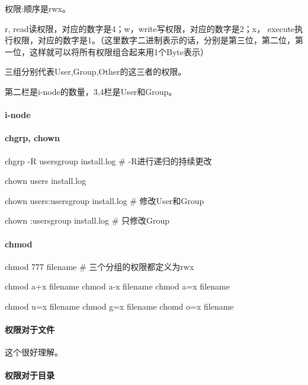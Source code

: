 权限:顺序是rwx。
 
r, read读权限，对应的数字是4；w，write写权限，对应的数字是2；x， execute执行权限，对应的数字是1。（这里数字二进制表示的话，分别是第三位，第二位，第一位，这样就可以将所有权限组合起来用1个Byte表示）
 
三组分别代表User,Group,Other的这三者的权限。

第二栏是i-node的数量，3,4栏是User和Group。

\paragraph{i-node}


\paragraph{chgrp, chown}

\begin{Bash}

chgrp -R usersgroup install.log 	# -R进行递归的持续更改

chown users install.log

chown users:usersgroup install.log  # 修改User和Group

chown :usersgroup install.log 		# 只修改Group

\end{Bash}


\paragraph{chmod}

\begin{Bash}

chmod 777 filename # 三个分组的权限都定义为rwx

chmod a+x filename
chmod a-x filename
chmod a=x filename

chmod u=x filename
chmod g=x filename
chomd o=x filename

\end{Bash}


\paragraph{权限对于文件}这个很好理解。

\paragraph{权限对于目录}

